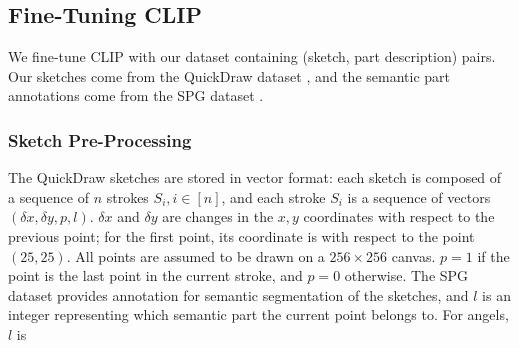 \subsection{Fine-Tuning CLIP}

We fine-tune CLIP with our dataset containing (sketch, part description) pairs. Our sketches come from the QuickDraw dataset \citep{ha2017neural}, and the semantic part annotations come from the SPG dataset \citep{spg_paper}. 

\subsubsection*{Sketch Pre-Processing}
The QuickDraw sketches are stored in vector format: each sketch is composed of a sequence of $n$ strokes $S_i, i \in [n]$, and each stroke $S_i$ is a sequence of vectors $(\delta x,\delta y, p, l)$. 
$\delta x$ and $\delta y$ are changes in the $x,y$ coordinates with respect to the previous point; for the first point, its coordinate is with respect to the point $(25,25)$. 
All points are assumed to be drawn on a $256 \times 256$ canvas. 
$p=1$ if the point is the last point in the current stroke, and $p=0$ otherwise. 
The SPG dataset provides annotation for semantic segmentation of the sketches, and $l$ is an integer representing which semantic part the current point belongs to. For angels, $l$ is 

